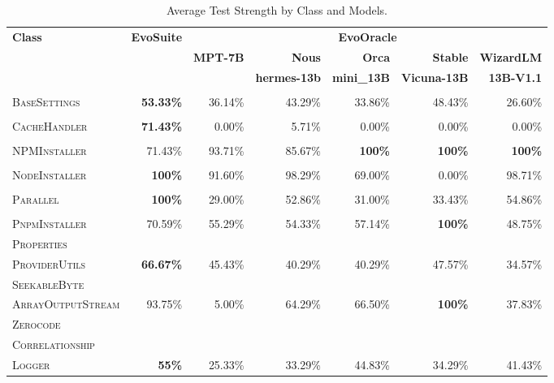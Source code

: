 \begin{table}[H]
\centering

\begin{tabular}{| l | r | r | r | r | r | r |}
\hline
\multirow{2}{*}{\textbf{Class}} & \multirow{2}{*}{\textbf{EvoSuite}} & \multicolumn{5}{c|}{\textbf{EvoOracle}} \\ %
\cline{3-7} %
 &  & \textbf{MPT-7B} & \textbf{Nous} & \textbf{Orca} & \textbf{Stable} & \textbf{WizardLM} \\
 &  &  & \textbf{hermes-13b} & \textbf{mini\_13B} & \textbf{Vicuna-13B} & \textbf{13B-V1.1} \\
\hline
\scriptsize\textsc{} &  &  &  &  &  &  \\
\scriptsize\textsc{BaseSettings} & \textbf{53.33\%} & 36.14\% & 43.29\% & 33.86\% & 48.43\% & 26.60\% \\
\hline
\scriptsize\textsc{} &  &  &  &  &  &  \\
\scriptsize\textsc{CacheHandler} & \textbf{71.43\%} & 0.00\% & 5.71\% & 0.00\% & 0.00\% & 0.00\% \\
\hline
\scriptsize\textsc{} &  &  &  &  &  &  \\
\scriptsize\textsc{NPMInstaller} & 71.43\% & 93.71\% & 85.67\% & \textbf{100\%} & \textbf{100\%} & \textbf{100\%} \\
\hline
\scriptsize\textsc{} &  &  &  &  &  &  \\
\scriptsize\textsc{NodeInstaller} & \textbf{100\%} & 91.60\% & 98.29\% & 69.00\% & 0.00\% & 98.71\% \\
\hline
\scriptsize\textsc{} &  &  &  &  &  &  \\
\scriptsize\textsc{Parallel} & \textbf{100\%} & 29.00\% & 52.86\% & 31.00\% & 33.43\% & 54.86\% \\
\hline
\scriptsize\textsc{} &  &  &  &  &  &  \\
\scriptsize\textsc{PnpmInstaller} & 70.59\% & 55.29\% & 54.33\% & 57.14\% & \textbf{100\%} & 48.75\% \\
\hline
\scriptsize\textsc{Properties} &  &  &  &  &  &  \\
\scriptsize\textsc{ProviderUtils} & \textbf{66.67\%} & 45.43\% & 40.29\% & 40.29\% & 47.57\% & 34.57\% \\
\hline
\scriptsize\textsc{SeekableByte} &  &  &  &  &  &  \\
\scriptsize\textsc{ArrayOutputStream} & 93.75\% & 5.00\% & 64.29\% & 66.50\% & \textbf{100\%} & 37.83\% \\
\hline
\scriptsize\textsc{Zerocode} &  &  &  &  &  &  \\
\scriptsize\textsc{Correlationship} &  &  &  &  &  &  \\
\scriptsize\textsc{Logger} & \textbf{55\%} & 25.33\% & 33.29\% & 44.83\% & 34.29\% & 41.43\% \\
\hline

\end{tabular}
\caption{Average Test Strength by Class and Models.\protect\footnotemark}
\label{tab:test_strength}
\end{table}

